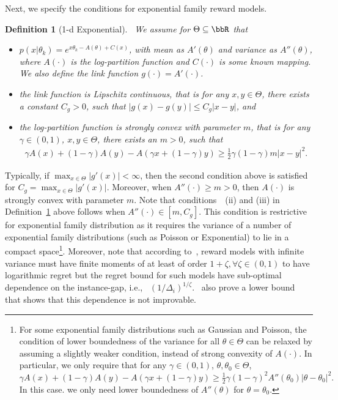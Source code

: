 \documentclass[11pt]{article}
\newtheorem{definition}[theorem]{Definition}
\begin{document}
Next, we specify the conditions for exponential family reward models. 
    \begin{definition}[1-d Exponential]~\label{def:rewardExp}
        We assume for $\Theta \subseteq \bbR$ that 
        \begin{itemize}
            \item[i.] $p(x|\theta_k) = e^{x \theta_k   -  A(\theta) + C(x) }$, with mean as $ A'(\theta)$ and variance as $A''( \theta)$, where $A(\cdot)$ is the log-partition function and $C(\cdot)$ is some known mapping. We also define the link function $g(\cdot)=A'(\cdot)$.  
            \item[ii.] the link function is Lipschitz continuous, that is for any $x,y\in \Theta$, there exists a constant $C_g>0$, such that
             $   |g(x)-g(y)|\leq C_g|x-y|$, and
            \item[iii.] the log-partition function is strongly convex with parameter $m$, that is for any $\gamma\in (0,1)$, $x,y\in \Theta$, there exists an $m>0$, such that
            \begin{align*}
                \gamma A(x) + (1-\gamma)A(y ) - A(\gamma x + (1-\gamma)y ) 
                \geq \frac{1}{2} \gamma (1-\gamma) m |x-y|^2.
            \end{align*}
        \end{itemize}
    \end{definition} 
  Typically, if $\max_{x\in \Theta}|g'(x)|<\infty$, then the second condition above is satisfied for $C_g= \max_{x\in \Theta}|g'(x)|$. %
    Moreover, when $A''(\cdot)\geq m >0$, then $A(\cdot)$ is strongly convex with parameter $m$. Note that conditions~~(ii) and (iii) in Definition~\ref{def:rewardExp}  above follows when $A''(\cdot)\in [m,C_g]$. This condition is restrictive for exponential family distribution as it requires the variance of a number of exponential family distributions (such as Poisson or Exponential) to lie in a compact space\footnote{For some exponential family distributions such as Gaussian and Poisson, the condition of lower boundedness of the variance for all $\theta\in \Theta$ can be relaxed by assuming a slightly weaker condition, instead of strong convexity of $A(\cdot)$. In particular, we only require that for any $\gamma\in (0,1)$, $\theta,\theta_0\in \Theta$, $
                \gamma A(x) + (1-\gamma)A(y ) - A(\gamma x + (1-\gamma)y ) 
                \geq \frac{1}{2} \gamma (1-\gamma)^2 A''(\theta_0) |\theta-\theta_0|^2.$
           In this case. we only need lower boundedness of $A''(\theta)$ for $\theta=\theta_0$.}. {Moreover, note that according to~\cite{bubeck2013bandits}, reward models with infinite variance must have finite moments of at least of order $1+\zeta, \forall \zeta\in(0,1)$  to have logarithmic regret but the regret bound for such models have sub-optimal dependence on the instance-gap, i.e., \ $(1/\Delta_i)^{1/\zeta}$.~\cite{bubeck2013bandits} also prove a lower bound that shows that this dependence is not improvable.} 
\end{document}
